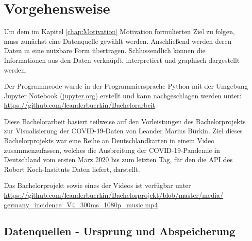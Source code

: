 \chapter{Vorgehensweise}\label{chap:Vorgehensweise}
Um dem im Kapitel \glqq{}\ref{chap:Motivation} Motivation\grqq{} formulierten Ziel zu folgen, muss zunächst eine Datenquelle gewählt werden.
Anschließend werden deren Daten in eine nutzbare Form übertragen.
Schlussendlich können die Informationen aus den Daten verknüpft, interpretiert und graphisch dargestellt werden.

Der Programmcode wurde in der Programmiersprache Python mit der Umgebung Jupyter Notebook (\href{jupyter.org}{jupyter.org}) erstellt und kann nachgeschlagen werden unter:\\
\href{https://github.com/leanderbuerkin/Bachelorarbeit}{https://github.com/leanderbuerkin/Bachelorarbeit}


Diese Bachelorarbeit basiert teilweise auf den Vorleistungen des Bachelorprojekts zur Visualisierung der COVID-19-Daten von Leander Marius Bürkin.
Ziel dieses Bachelorprojekts war eine Reihe an Deutschlandkarten in einem Video zusammenzufassen, welches die Ausbreitung der COVID-19-Pandemie in Deutschland vom ersten März 2020 bis zum letzten Tag, für den die API des Robert Koch-Instituts Daten liefert, darstellt.


Das Bachelorprojekt sowie eines der Videos ist verfügbar unter\\
\href{https://github.com/leanderbuerkin/Bachelorprojekt/blob/master/media/germany_incidence_V4_300ms_1080p_music.mp4}{https://github.com/leanderbuerkin/Bachelorprojekt/blob/master/media/}\\
\href{https://github.com/leanderbuerkin/Bachelorprojekt/blob/master/media/germany_incidence_V4_300ms_1080p_music.mp4}{germany\_incidence\_V4\_300ms\_1080p\_music.mp4}

\section{Datenquellen - Ursprung und Abspeicherung}\label{sec:Datenquelle}

